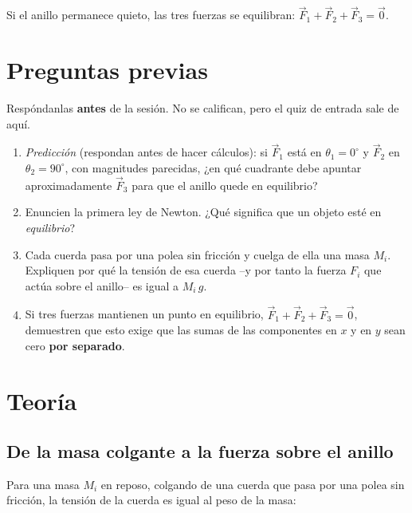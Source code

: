 \documentclass[11pt, letterpaper]{article}
\begin{document}
	\noindent
	Si el anillo permanece quieto, las tres fuerzas se equilibran:
	$\vec{F}_1 + \vec{F}_2 + \vec{F}_3 = \vec{0}$.
	
	\section{Preguntas previas}\label{sec:previas}
	
	Respóndanlas \textbf{antes} de la sesión. No se califican, pero el quiz de
	entrada sale de aquí.
	
	\begin{enumerate}
		\item \emph{Predicción} (respondan antes de hacer cálculos): si
		$\vec{F}_1$ está en $\theta_1 = 0^\circ$ y $\vec{F}_2$ en
		$\theta_2 = 90^\circ$, con magnitudes parecidas, ¿en qué cuadrante
		debe apuntar aproximadamente $\vec{F}_3$ para que el anillo quede en
		equilibrio?
		
		\item Enuncien la primera ley de Newton. ¿Qué significa que un objeto
		esté en \emph{equilibrio}?
		
		\item Cada cuerda pasa por una polea sin fricción y cuelga de ella una
		masa $M_i$. Expliquen por qué la tensión de esa cuerda --y por tanto la
		fuerza $F_i$ que actúa sobre el anillo-- es igual a $M_i\,g$.
		
		\item Si tres fuerzas mantienen un punto en equilibrio,
		$\vec{F}_1+\vec{F}_2+\vec{F}_3=\vec{0}$, demuestren que esto exige que
		las sumas de las componentes en $x$ y en $y$ sean cero \textbf{por
			separado}.
	\end{enumerate}
	
	\section{Teoría}
	
	\subsection*{De la masa colgante a la fuerza sobre el anillo}
	
	Para una masa $M_i$ en reposo, colgando de una cuerda que pasa por una
	polea sin fricción, la tensión de la cuerda es igual al peso de la masa:
	
\end{document}
